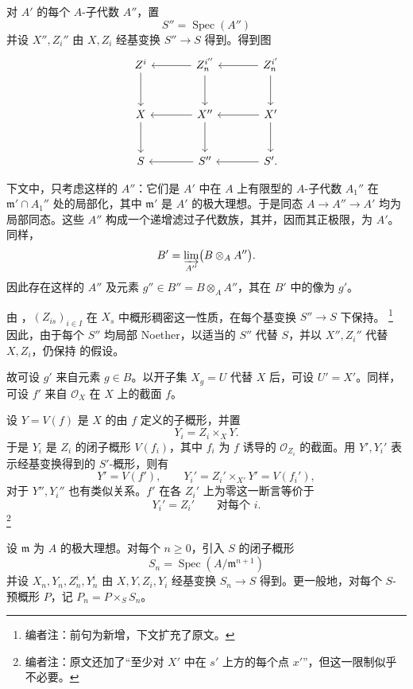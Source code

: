 对 \(A'\) 的每个 \(A\)-子代数 \(A''\)，置
\[
  S''=\operatorname{Spec}(A'')
\]
并设 \(X'',Z_i''\) 由 \(X,Z_i\) 经基变换 \(S''\to S\) 得到。得到图
\[
\begin{tikzcd}[column sep=large,row sep=large]
  Z^i \arrow[d] & Z_n^{i''} \arrow[l]\arrow[d]
    & Z_n^{i'} \arrow[l]\arrow[d] \\
  X \arrow[d] & X'' \arrow[l]\arrow[d] & X' \arrow[l]\arrow[d] \\
  S & S'' \arrow[l] & S' \arrow[l].
\end{tikzcd}
\]

下文中，只考虑这样的 \(A''\)：它们是 \(A'\) 中在 \(A\) 上有限型的 \(A\)-子代数 \(A_1''\) 在 \(\mathfrak m'\cap A_1''\) 处的局部化，其中 \(\mathfrak m'\) 是 \(A'\) 的极大理想。于是同态 \(A\to A''\to A'\) 均为局部同态。这些 \(A''\) 构成一个递增滤过子代数族，其并，因而其正极限，为 \(A'\)。同样，
\[
  B'=\varinjlim_{A''}\bigl(B\otimes_A A''\bigr).
\]
因此存在这样的 \(A''\) 及元素 \(g''\in B''=B\otimes_A A''\)，其在 \(B'\) 中的像为 \(g'\)。

由 ，\((Z_{is})_{i\in I}\) 在 \(X_s\) 中概形稠密这一性质，在每个基变换 \(S''\to S\) 下保持。%
\footnote{编者注：前句为新增，下文扩充了原文。}
因此，由于每个 \(S''\) 均局部 Noether，以适当的 \(S''\) 代替 \(S\)，并以 \(X'',Z_i''\) 代替 \(X,Z_i\)，仍保持  的假设。

故可设 \(g'\) 来自元素 \(g\in B\)。以开子集 \(X_g=U\) 代替 \(X\) 后，可设 \(U'=X'\)。同样，可设 \(f'\) 来自 \(\mathscr O_X\) 在 \(X\) 上的截面 \(f\)。

设 \(Y=V(f)\) 是 \(X\) 的由 \(f\) 定义的子概形，并置
\[
  Y_i=Z_i\times_XY.
\]
于是 \(Y_i\) 是 \(Z_i\) 的闭子概形 \(V(f_i)\)，其中 \(f_i\) 为 \(f\) 诱导的 \(\mathscr O_{Z_i}\) 的截面。用 \(Y',Y_i'\) 表示经基变换得到的 \(S'\)-概形，则有
\[
  Y'=V(f'),
  \qquad
  Y_i'=Z_i'\times_{X'}Y'=V(f_i'),
\]
对于 \(Y'',Y_i''\) 也有类似关系。\(f'\) 在各 \(Z_i'\) 上为零这一断言等价于
\[
  Y_i'=Z_i'\qquad\text{对每个 }i.
\]
\footnote{编者注：原文还加了“至少对 \(X'\) 中在 \(s'\) 上方的每个点 \(x'\)”，但这一限制似乎不必要。}

设 \(\mathfrak m\) 为 \(A\) 的极大理想。对每个 \(n\geq0\)，引入 \(S\) 的闭子概形
\[
  S_n=\operatorname{Spec}(A/\mathfrak m^{n+1})
\]
并设 \(X_n,Y_n,Z_n^i,Y_n^i\) 由 \(X,Y,Z_i,Y_i\) 经基变换 \(S_n\to S\) 得到。更一般地，对每个 \(S\)-预概形 \(P\)，记 \(P_n=P\times_SS_n\)。


